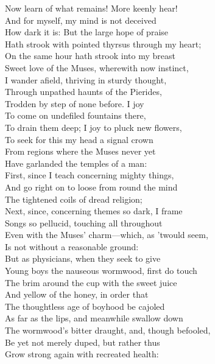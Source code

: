 
Now learn of what remains! More keenly hear!\\
And for myself, my mind is not deceived\\
How dark it is: But the large hope of praise\\
Hath strook with pointed thyrsus through my heart;\\
On the same hour hath strook into my breast\\
Sweet love of the Muses, wherewith now instinct,\\
I wander afield, thriving in sturdy thought,\\
Through unpathed haunts of the Pierides,\\
Trodden by step of none before. I joy\\
To come on undefiled fountains there,\\
To drain them deep; I joy to pluck new flowers,\\
To seek for this my head a signal crown\\
From regions where the Muses never yet\\
Have garlanded the temples of a man:\\
First, since I teach concerning mighty things,\\
And go right on to loose from round the mind\\
The tightened coils of dread religion;\\
Next, since, concerning themes so dark, I frame\\
Songs so pellucid, touching all throughout\\
Even with the Muses' charm—which, as 'twould seem,\\
Is not without a reasonable ground:\\
But as physicians, when they seek to give\\
Young boys the nauseous wormwood, first do touch\\
The brim around the cup with the sweet juice\\
And yellow of the honey, in order that\\
The thoughtless age of boyhood be cajoled\\
As far as the lips, and meanwhile swallow down\\
The wormwood's bitter draught, and, though befooled,\\
Be yet not merely duped, but rather thus\\
Grow strong again with recreated health:\\
